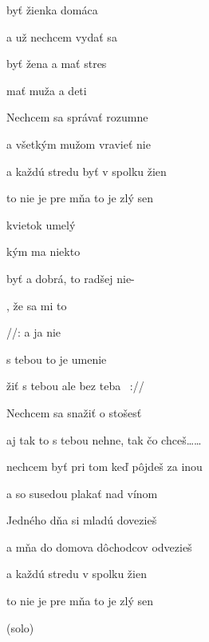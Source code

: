 

\zs
{} byť žienka domáca

a už  nechcem vydať sa

 byť žena a mať stres

 mať muža a deti 
\ks

\zs
Nechcem sa správať rozumne

a všetkým mužom vravieť nie

a každú stredu byť v spolku žien

to nie je pre mňa to je zlý sen
\ks

\zr
{} kvietok umelý

 kým ma niekto 

byť  a dobrá, to radšej nie-

, že sa mi to 

//:  a ja nie

 s tebou to je umenie

 žiť s tebou ale bez teba  ~:// 
\kr

\zs
Nechcem sa snažiť o stošesť

aj tak to s tebou nehne, tak čo chceš……

nechcem byť pri tom keď pôjdeš za inou

a so susedou plakať nad vínom
\ks

\zs
Jedného dňa si mladú dovezieš

a mňa do domova dôchodcov odvezieš

a každú stredu v spolku žien

to nie je pre mňa to je zlý sen
\ks

\zr \kr
(solo)
\zr \kr
\kp